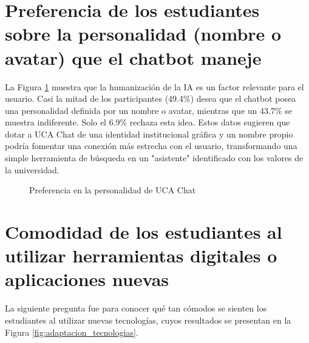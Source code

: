 {{\section{Preferencia de los estudiantes sobre la personalidad (nombre o avatar) que el chatbot maneje}
La Figura \ref{fig:preferencia_personalidad} muestra que la humanización de la IA es un factor relevante para el usuario. Casi la mitad de los participantes (49.4\%) desea que el chatbot posea una personalidad definida por un nombre o avatar, mientras que un 43.7\% se muestra indiferente. Solo el 6.9\% rechaza esta idea. Estos datos sugieren que dotar a UCA Chat de una identidad institucional gráfica y un nombre propio podría fomentar una conexión más estrecha con el usuario, transformando una simple herramienta de búsqueda en un "asistente" identificado con los valores de la universidad.

\begin{figure}[H]
    \centering
    \caption{Preferencia en la personalidad de UCA Chat}
    \label{fig:preferencia_personalidad}
\end{figure}

\section{Comodidad de los estudiantes al utilizar herramientas digitales o aplicaciones nuevas}
La siguiente pregunta fue para conocer qué tan cómodos se sienten los estudiantes al utilizar nuevas tecnologías, cuyos resultados se presentan en la Figura \ref{fig:adaptacion_tecnologias}.

}}
